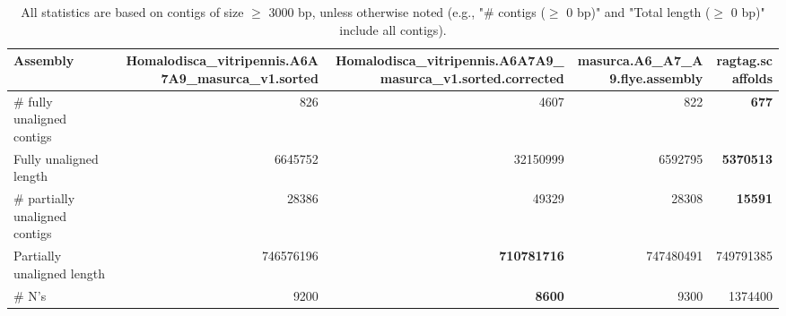 \documentclass[12pt,a4paper]{article}
\begin{document}
\begin{table}[ht]
\begin{center}
\caption{All statistics are based on contigs of size $\geq$ 3000 bp, unless otherwise noted (e.g., "\# contigs ($\geq$ 0 bp)" and "Total length ($\geq$ 0 bp)" include all contigs).}
\begin{tabular}{|l*{4}{|r}|}
\hline
Assembly & Homalodisca\_vitripennis.A6A7A9\_masurca\_v1.sorted & Homalodisca\_vitripennis.A6A7A9\_masurca\_v1.sorted.corrected & masurca.A6\_A7\_A9.flye.assembly & ragtag.scaffolds \\ \hline
\# fully unaligned contigs & 826 & 4607 & 822 & {\bf 677} \\ \hline
Fully unaligned length & 6645752 & 32150999 & 6592795 & {\bf 5370513} \\ \hline
\# partially unaligned contigs & 28386 & 49329 & 28308 & {\bf 15591} \\ \hline
Partially unaligned length & 746576196 & {\bf 710781716} & 747480491 & 749791385 \\ \hline
\# N's & 9200 & {\bf 8600} & 9300 & 1374400 \\ \hline
\end{tabular}
\end{center}
\end{table}
\end{document}
